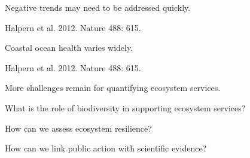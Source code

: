 \documentclass[t]{beamer}
\begin{document}
{
\begin{frame}[b]{Negative trends may need to be addressed quickly.}

\tiny\hfill Halpern et al. 2012. Nature 488: 615.
\end{frame}
}

{
\begin{frame}[b]{Coastal ocean health varies widely.}

\tiny\hfill Halpern et al. 2012. Nature 488: 615.
\end{frame}
}


\begin{frame}[t]{More challenges remain for quantifying ecosystem services.}

\hangpara What is the role of biodiversity in supporting ecosystem services?

\hangpara How can we assess ecosystem resilience?

\hangpara How can we link public action with scientific evidence?

\end{frame}
\end{document}
